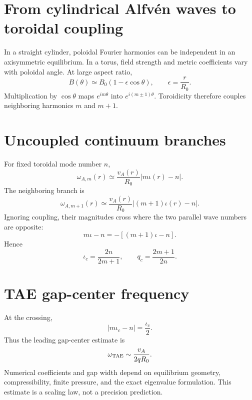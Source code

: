 \documentclass[11pt]{article}
\begin{document}
\section{From cylindrical Alfvén waves to toroidal coupling}

In a straight cylinder, poloidal Fourier harmonics can be independent in an axisymmetric equilibrium. In a torus, field strength and metric coefficients vary with poloidal angle. At large aspect ratio,
\begin{equation}
B(\theta)\simeq B_0(1-\epsilon\cos\theta),\qquad
\epsilon=\frac{r}{R_0}.
\end{equation}
Multiplication by $\cos\theta$ maps $e^{im\theta}$ into $e^{i(m\pm1)\theta}$. Toroidicity therefore couples neighboring harmonics $m$ and $m+1$.


\section{Uncoupled continuum branches}

For fixed toroidal mode number $n$,
\begin{equation}
\omega_{A,m}(r)\simeq
\frac{v_A(r)}{R_0}|m\iota(r)-n|.
\end{equation}
The neighboring branch is
\begin{equation}
\omega_{A,m+1}(r)\simeq
\frac{v_A(r)}{R_0}|(m+1)\iota(r)-n|.
\end{equation}
Ignoring coupling, their magnitudes cross where the two parallel wave numbers are opposite:
\begin{equation}
m\iota-n=-[(m+1)\iota-n].
\end{equation}
Hence
\begin{equation}
\boxed{\iota_c=\frac{2n}{2m+1}},
\qquad
\boxed{q_c=\frac{2m+1}{2n}}.
\end{equation}


\section{TAE gap-center frequency}

At the crossing,
\begin{equation}
|m\iota_c-n|=\frac{\iota_c}{2}.
\end{equation}
Thus the leading gap-center estimate is
\begin{equation}
\omega_{\rm TAE}\sim
\frac{v_A}{2qR_0}.
\end{equation}
Numerical coefficients and gap width depend on equilibrium geometry, compressibility, finite pressure, and the exact eigenvalue formulation. This estimate is a scaling law, not a precision prediction.
\end{document}
